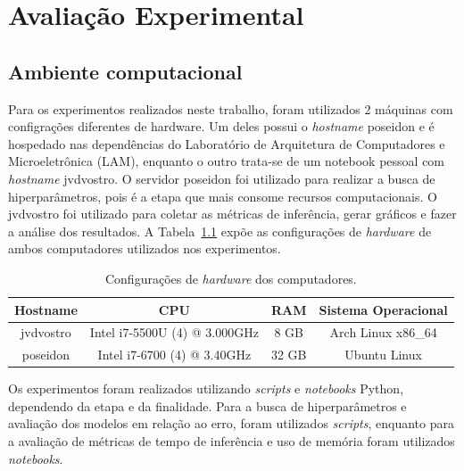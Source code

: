 \chapter{Avaliação Experimental}
\section{Ambiente computacional}
Para os experimentos realizados neste trabalho, foram utilizados 2 máquinas com configrações diferentes de hardware. Um deles possui o \textit{hostname} poseidon e é hospedado nas dependências do Laboratório de Arquitetura de Computadores e Microeletrônica (LAM), enquanto o outro trata-se de um notebook pessoal com \textit{hostname} jvdvostro. O servidor poseidon foi utilizado para realizar a busca de hiperparâmetros, pois é a etapa que mais consome recursos computacionais. O jvdvostro foi utilizado para coletar as métricas de inferência, gerar gráficos e fazer a análise dos resultados. A Tabela~\ref{tab:hardware} expõe as configurações de \textit{hardware} de ambos computadores utilizados nos experimentos.

\begin{table}[!htp] \label{tab:hardware}
    \caption{Configurações de \textit{hardware} dos computadores.}
    \setlength\extrarowheight{5pt}
    \centering
    \begin{tabular}{|c|c|c|c|}
        \hline
        \rowcolor[HTML]{C0C0C0}
        Hostname  & CPU                           & RAM   & Sistema Operacional \\ \hline
        jvdvostro & Intel i7-5500U (4) @ 3.000GHz & 8 GB  & Arch Linux x86\_64  \\ \hline
        poseidon  & Intel i7-6700 (4) @ 3.40GHz   & 32 GB & Ubuntu Linux        \\ \hline
    \end{tabular}
\end{table}

Os experimentos foram realizados utilizando \textit{scripts} e \textit{notebooks} Python, dependendo da etapa e da finalidade. Para a busca de hiperparâmetros e avaliação dos modelos em relação ao erro, foram utilizados \textit{scripts}, enquanto para a avaliação de métricas de tempo de inferência e uso de memória foram utilizados \textit{notebooks}.

